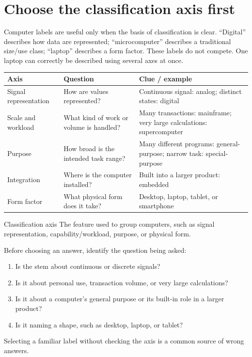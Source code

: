 \section{Choose the classification axis first}
Computer labels are useful only when the basis of classification is clear.
``Digital'' describes how data are represented; ``microcomputer'' describes
a traditional size/use class; ``laptop'' describes a form factor. These
labels do not compete. One laptop can correctly be described using several
axes at once.

\begin{center}
\begin{tabular}{p{}p{}p{}}
\toprule
\textbf{Axis} & \textbf{Question} & \textbf{Clue / example}\\
\midrule
Signal representation & How are values represented? & Continuous signal: analog; distinct states: digital\\
Scale and workload & What kind of work or volume is handled? & Many transactions: mainframe; very large calculations: supercomputer\\
Purpose & How broad is the intended task range? & Many different programs: general-purpose; narrow task: special-purpose\\
Integration & Where is the computer installed? & Built into a larger product: embedded\\
Form factor & What physical form does it take? & Desktop, laptop, tablet, or smartphone\\
\bottomrule
\end{tabular}
\end{center}

\begin{definitionbox}{Classification axis}
The feature used to group computers, such as signal representation,
capability/workload, purpose, or physical form.
\end{definitionbox}

Before choosing an answer, identify the question being asked:
\begin{enumerate}
  \item Is the stem about continuous or discrete signals?
  \item Is it about personal use, transaction volume, or very large
    calculations?
  \item Is it about a computer's general purpose or its built-in role in a
    larger product?
  \item Is it naming a shape, such as desktop, laptop, or tablet?
\end{enumerate}
Selecting a familiar label without checking the axis is a common source of
wrong answers.

